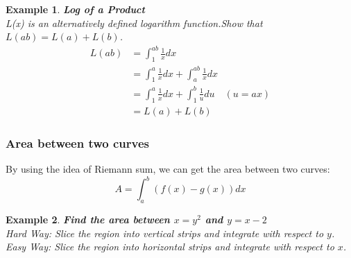 \documentclass[10pt, a4paper]{article}
\newtheorem{example}{Example}
\begin{document}
\begin{example}
    \textbf{Log of a Product} \\
    L(x) is an alternatively defined logarithm function.Show that $L(ab) = L(a) + L(b)$.
    \begin{align*}
        L(ab) &= \int_1^{ab}\frac{1}{x}dx \\
        &= \int_1^a\frac{1}{x}dx + \int_a^{ab}\frac{1}{x}dx \\
        &= \int_1^a\frac{1}{x}dx + \int_1^b\frac{1}{u}du \quad (u = ax) \\
        &= L(a) + L(b)
    \end{align*}
\end{example}

\subsubsection*{Area between two curves}
\begin{center}
\end{center}

 By using the idea of Riemann sum, we can get the area between two curves:
\[ A=\int_a^b\left(f(x)-g(x)\right)dx\]
\begin{example}
    \textbf{Find the area between $x = y^2$ and $y = x - 2$}\\
    Hard Way: Slice the region into vertical strips and integrate with respect to $y$.\\
    Easy Way: Slice the region into horizontal strips and integrate with respect to $x$.
\end{example}
\end{document}

